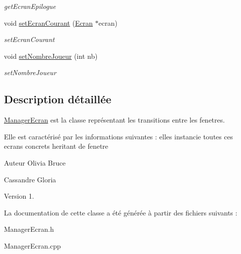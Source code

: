 \begin{DoxyCompactItemize}
\begin{DoxyCompactList}\small\item\em get\-Ecran\-Epilogue \end{DoxyCompactList}\item 
\hypertarget{classManagerEcran_a5cad423b45182e2640e3ef758164ef6b}{void \hyperlink{classManagerEcran_a5cad423b45182e2640e3ef758164ef6b}{set\-Ecran\-Courant} (\hyperlink{classEcran}{\-Ecran} $\ast$ecran)}\label{classManagerEcran_a5cad423b45182e2640e3ef758164ef6b}

\begin{DoxyCompactList}\small\item\em set\-Ecran\-Courant \end{DoxyCompactList}\item 
\hypertarget{classManagerEcran_a5e1c6000fc4baf622b2b460c28986c00}{void \hyperlink{classManagerEcran_a5e1c6000fc4baf622b2b460c28986c00}{set\-Nombre\-Joueur} (int nb)}\label{classManagerEcran_a5e1c6000fc4baf622b2b460c28986c00}

\begin{DoxyCompactList}\small\item\em set\-Nombre\-Joueur \end{DoxyCompactList}\end{DoxyCompactItemize}


\subsection{\-Description détaillée}
\hyperlink{classManagerEcran}{\-Manager\-Ecran} est la classe représentant les transitions entre les fenetres. 

\-Elle est caractérisé par les informations suivantes \-: elles instancie toutes ces ecrans concrets heritant de fenetre

\begin{DoxyAuthor}{\-Auteur}
\-Olivia \-Bruce 

\-Cassandre \-Gloria 
\end{DoxyAuthor}
\begin{DoxyVersion}{\-Version}
1. 
\end{DoxyVersion}


\-La documentation de cette classe a été générée à partir des fichiers suivants \-:\begin{DoxyCompactItemize}
\item 
\-Manager\-Ecran.\-h\item 
\-Manager\-Ecran.\-cpp\end{DoxyCompactItemize}
